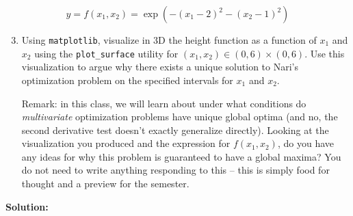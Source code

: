 \documentclass{harvardml}
\theoremstyle{definition}
\theoremstyle{plain}
\begin{document}
\begin{problem}
$$y = f(x_1, x_2) = \exp\left(-(x_1 - 2)^2 - (x_2 - 1)^2 \right)$$
\begin{enumerate}
    \setcounter{enumi}{2}
    \item Using \texttt{matplotlib}, visualize in 3D the height function as a function of $x_1$ and $x_2$ using the \texttt{plot\_surface} utility for $(x_1, x_2) \in (0, 6) \times (0, 6)$. Use this visualization to argue why there exists a unique solution to Nari's optimization problem on the specified intervals for $x_1$ and $x_2$.

    Remark: in this class, we will learn about under what conditions do \textit{multivariate} optimization problems have unique global optima (and no, the second derivative test doesn't exactly generalize directly). Looking at the visualization you produced and the expression for $f(x_1, x_2)$, do you have any ideas for why this problem is guaranteed to have a global maxima? You do not need to write anything responding to this -- this is simply food for thought and a preview for the semester.
\end{enumerate}

\end{problem}
\pagebreak
\textbf{Solution:}\\
\end{document}
